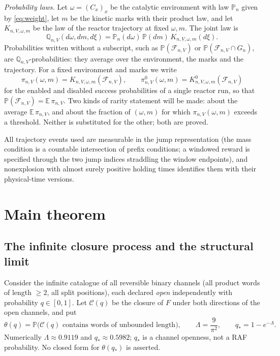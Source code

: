 \documentclass[11pt,letterpaper]{article}
\theoremstyle{plain}
\theoremstyle{definition}
\theoremstyle{remark}
\numberwithin{equation}{section}
\newcommand{\PP}{\mathbb P}
\newcommand{\EE}{\mathbb E}
\newcommand{\QQ}{\mathbb Q}
\newcommand{\cF}{\mathcal F}
\newcommand{\cC}{\mathcal C}
\newcommand{\thetaq}{\theta(q_*)}
\begin{document}
\emph{Probability laws.} Let $\omega=(C_x)_x$ be the catalytic environment with law $\PP_n$ given by \eqref{eq:weight}, let $m$ be the kinetic marks with their product law, and let $K_{n,V,\omega,m}$ be the law of the reactor trajectory at fixed $\omega,m$. The joint law is
\[
 \QQ_{n,V}(d\omega,dm,d\xi)=\PP_n(d\omega)\,\PP(dm)\,K_{n,V,\omega,m}(d\xi).
\]
Probabilities written without a subscript, such as $\PP(\cF_{n,V})$ or $\PP(\cF_{n,V}\cap G_n)$, are $\QQ_{n,V}$-probabilities: they average over the environment, the marks and the trajectory. For a fixed environment and marks we write
\begin{equation}\label{eq:pi}
 \pi_{n,V}(\omega,m)=K_{n,V,\omega,m}(\cF_{n,V}),\qquad \pi^0_{n,V}(\omega,m)=K^0_{n,V,\omega,m}(\cF_{n,V})
\end{equation}
for the enabled and disabled success probabilities of a single reactor run, so that $\PP(\cF_{n,V})=\EE\,\pi_{n,V}$. Two kinds of rarity statement will be made: about the average $\EE\,\pi_{n,V}$, and about the fraction of $(\omega,m)$ for which $\pi_{n,V}(\omega,m)$ exceeds a threshold. Neither is substituted for the other; both are proved.

All trajectory events used are measurable in the jump representation (the mass condition is a countable intersection of prefix conditions; a windowed reward is specified through the two jump indices straddling the window endpoints), and nonexplosion with almost surely positive holding times identifies them with their physical-time versions.

\section{Main theorem}\label{sec:main}

\subsection{The infinite closure process and the structural limit}
Consider the infinite catalogue of all reversible binary channels (all product words of length $\ge2$, all split positions), each declared \emph{open} independently with probability $q\in[0,1]$. Let $\cC(q)$ be the closure of $F$ under both directions of the open channels, and put
\begin{equation}\label{eq:theta}
 \theta(q)=\PP\bigl(\cC(q)\text{ contains words of unbounded length}\bigr),\qquad
 \Lambda=\frac9{\pi^2},\qquad q_*=1-e^{-\Lambda}.
\end{equation}
Numerically $\Lambda\approx0.9119$ and $q_*\approx0.5982$; $q_*$ is a channel openness, not a RAF probability. No closed form for $\thetaq$ is asserted.
\end{document}
